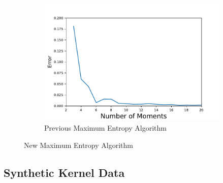 \documentclass[letterpaper]{article} %
\begin{document}
\begin{figure}
\begin{subfigure}
		\caption{New Maximum Entropy Algorithm}
		\label{fig:newmaxentmomentsentropy}
	\end{subfigure}
	\begin{subfigure}%
		\centering
		\includegraphics[width=.8\linewidth]{errorvsmomentsthermonew}
		\caption{Previous Maximum Entropy Algorithm}
		\label{fig:newsmaxentmomentserror}
	\end{subfigure}
	\caption{New Maximum Entropy Algorithm}
\end{figure}

\subsection{Synthetic Kernel Data}
\end{document}
